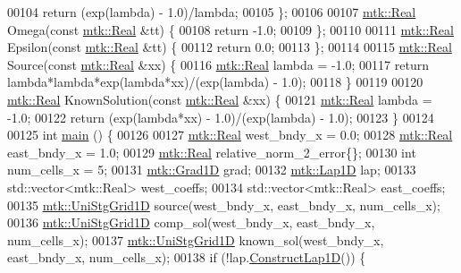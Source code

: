 \begin{DoxyCode}
00104   \textcolor{keywordflow}{return} (exp(lambda) - 1.0)/lambda;
00105 \};
00106 
00107 \hyperlink{group__c01-roots_gac080bbbf5cbb5502c9f00405f894857d}{mtk::Real} Omega(\textcolor{keyword}{const} \hyperlink{group__c01-roots_gac080bbbf5cbb5502c9f00405f894857d}{mtk::Real} &tt) \{
00108   \textcolor{keywordflow}{return} -1.0;
00109 \};
00110 
00111 \hyperlink{group__c01-roots_gac080bbbf5cbb5502c9f00405f894857d}{mtk::Real} Epsilon(\textcolor{keyword}{const} \hyperlink{group__c01-roots_gac080bbbf5cbb5502c9f00405f894857d}{mtk::Real} &tt) \{
00112   \textcolor{keywordflow}{return} 0.0;
00113 \};
00114 
00115 \hyperlink{group__c01-roots_gac080bbbf5cbb5502c9f00405f894857d}{mtk::Real} Source(\textcolor{keyword}{const} \hyperlink{group__c01-roots_gac080bbbf5cbb5502c9f00405f894857d}{mtk::Real} &xx) \{
00116   \hyperlink{group__c01-roots_gac080bbbf5cbb5502c9f00405f894857d}{mtk::Real} lambda = -1.0;
00117   \textcolor{keywordflow}{return} lambda*lambda*exp(lambda*xx)/(exp(lambda) - 1.0);
00118 \}
00119 
00120 \hyperlink{group__c01-roots_gac080bbbf5cbb5502c9f00405f894857d}{mtk::Real} KnownSolution(\textcolor{keyword}{const} \hyperlink{group__c01-roots_gac080bbbf5cbb5502c9f00405f894857d}{mtk::Real} &xx) \{
00121   \hyperlink{group__c01-roots_gac080bbbf5cbb5502c9f00405f894857d}{mtk::Real} lambda = -1.0;
00122   \textcolor{keywordflow}{return} (exp(lambda*xx) - 1.0)/(exp(lambda) - 1.0);
00123 \}
00124 
00125 \textcolor{keywordtype}{int} \hyperlink{minimalistic__poisson__1d_8cc_ae66f6b31b5ad750f1fe042a706a4e3d4}{main} () \{
00126 
00127   \hyperlink{group__c01-roots_gac080bbbf5cbb5502c9f00405f894857d}{mtk::Real} west\_bndy\_x = 0.0;
00128   \hyperlink{group__c01-roots_gac080bbbf5cbb5502c9f00405f894857d}{mtk::Real} east\_bndy\_x = 1.0;
00129   \hyperlink{group__c01-roots_gac080bbbf5cbb5502c9f00405f894857d}{mtk::Real} relative\_norm\_2\_error\{\};
00130   \textcolor{keywordtype}{int} num\_cells\_x = 5;
00131   \hyperlink{classmtk_1_1Grad1D}{mtk::Grad1D} grad;
00132   \hyperlink{classmtk_1_1Lap1D}{mtk::Lap1D} lap;
00133   std::vector<mtk::Real> west\_coeffs;
00134   std::vector<mtk::Real> east\_coeffs;
00135   \hyperlink{classmtk_1_1UniStgGrid1D}{mtk::UniStgGrid1D} source(west\_bndy\_x, east\_bndy\_x, num\_cells\_x);
00136   \hyperlink{classmtk_1_1UniStgGrid1D}{mtk::UniStgGrid1D} comp\_sol(west\_bndy\_x, east\_bndy\_x, num\_cells\_x);
00137   \hyperlink{classmtk_1_1UniStgGrid1D}{mtk::UniStgGrid1D} known\_sol(west\_bndy\_x, east\_bndy\_x, num\_cells\_x);
00138   \textcolor{keywordflow}{if} (!lap.\hyperlink{classmtk_1_1Lap1D_a685dcba88c08cf5b7b6c2aa4669a472c}{ConstructLap1D}()) \{

\end{DoxyCode}
